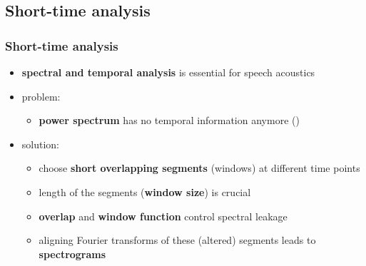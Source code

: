 
\subsection{Short-time analysis}

\begin{frame} %
	\frametitle{Short-time analysis}
	\begin{itemize}
		\item \textbf{spectral and temporal analysis} is essential for speech acoustics
		\item problem:
			\begin{itemize}
				\item \textbf{power spectrum} has no temporal information anymore ()
					\begin{figure}
						\centering
						\begin{subfigure}[c]{0.48\linewidth}
						\end{subfigure}
						\hspace{0.01\linewidth}
						\begin{subfigure}[c]{0.48\linewidth}
						\end{subfigure}
					\end{figure}
			\end{itemize}
		\item solution:
			\begin{itemize}
				\item choose \textbf{short overlapping segments} (windows) at different time points
				\item length of the segments (\textbf{window size}) is crucial
				\item \textbf{overlap} and \textbf{window function} control spectral leakage
				\item aligning Fourier transforms of these (altered) segments leads to \textbf{spectrograms}
			\end{itemize}
	\end{itemize}
\end{frame}

